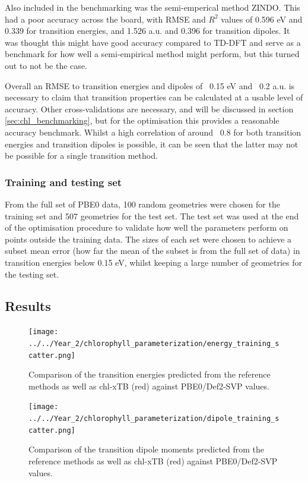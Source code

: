 Also included in the benchmarking was the semi-emperical method ZINDO. This had a
poor accuracy across the board, with RMSE and $R^2$ values of 0.596 eV and 0.339
for transition energies, and 1.526 a.u. and 0.396 for transition dipoles. It was
thought this might have good accuracy compared to TD-DFT and serve as a benchmark
for how well a semi-empirical method might perform, but this turned out to not be
the case.

Overall an RMSE to transition energies and dipoles of ~0.15 eV and ~0.2 a.u. is 
necessary to claim that transition properties can be calculated at a usable level 
of accuracy. Other cross-validations are necessary, and will be discussed in section
\ref{sec:chl_benchmarking}, but for the optimisation this provides a reasonable 
accuracy benchmark. Whilst a high correlation of around ~0.8 for both transition 
energies and transition dipoles is possible, it can be seen that the latter may 
not be possible for a single transition method.

\subsubsection{Training and testing set}
\label{subsubsec:train_test}
From the full set of PBE0 data, 100 random geometries were chosen for the training 
set and 507 geometries for the test set. The test set was used at the end of the 
optimisation procedure to validate how well the parameters perform on points outside 
the training data. The sizes of each set were chosen to achieve a subset mean error
(how far the mean of the subset is from the full set of data) in transition energies
below 0.15 eV, whilst keeping a large number of geometries for the testing set.

\afterpartskip
\subsection{Results}
\label{subsec:chl_opt_results}

\begin{figure}
    \centering
    \texttt{[image: ../../Year\_2/chlorophyll\_parameterization/energy\_training\_scatter.png]}
    \label{fig:energy_training_scatter}
    \caption{Comparison of the \Qy transition energies predicted from the reference
    methods as well as chl-xTB (red) against PBE0/Def2-SVP values.}
\end{figure}

\begin{figure}
    \centering
    \texttt{[image: ../../Year\_2/chlorophyll\_parameterization/dipole\_training\_scatter.png]}
    \label{fig:dipole_training_scatter}
    \caption{Comparison of the \Qy transition dipole moments predicted from the
    reference methods as well as chl-xTB (red) against PBE0/Def2-SVP values.}
\end{figure}

